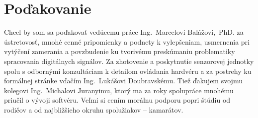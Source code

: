 \thispagestyle{empty}
\vspace*{\fill}
\section*{Poďakovanie}
Chcel by som sa poďakovať vedúcemu práce Ing.~Marcelovi Balážovi,~PhD. za ústretovosť, mnohé cenné pripomienky a podnety k vylepšeniam, usmernenia pri vytýčení 
zamerania a povzbudenie ku tvorivému preskúmaniu problematiky spracovania digitálnych signálov. Za zhotovenie a poskytnutie 
senzorovej jednotky spolu s odbornými konzultáciam k detailom ovládania hardvéru a za postrehy ku formálnej stránke vďačím Ing.~Lukášovi Doubravskému. Tiež ďakujem svojmu kolegovi Ing.~Michalovi Juranyimu, ktorý ma za roky spolupráce mnohému priučil o vývoji softvéru.
Veľmi si cením morálnu podporu popri štúdiu od rodičov a od najbližšieho okruhu spolužiakov -- kamarátov.
\vspace{3cm}